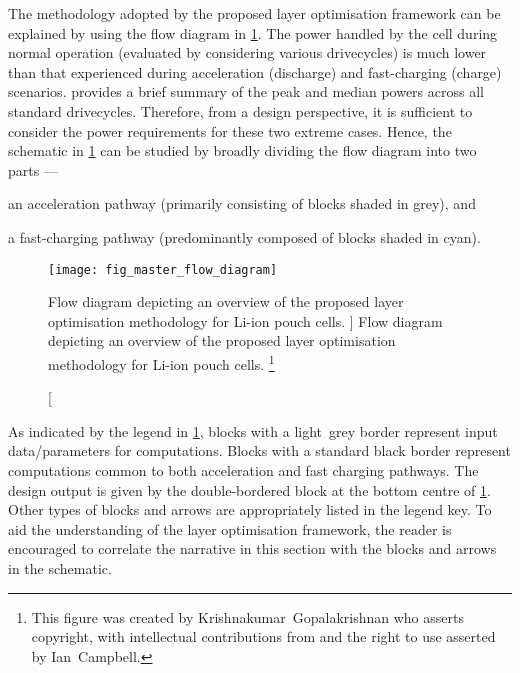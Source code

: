 

The  methodology adopted  by the  proposed layer  optimisation framework  can be
explained by  using the  flow diagram in  \cref{fig:fig_strategy_schematic}. The
power  handled by  the cell  during normal  operation (evaluated  by considering
various drivecycles)  is much  lower than  that experienced  during acceleration
(discharge)  and  fast-charging (charge)  scenarios.  
provides  a brief  summary of  the peak  and median  powers across  all standard
drivecycles. Therefore, from a design  perspective, it is sufficient to consider
the power  requirements for  these two  extreme cases.  Hence, the  schematic in
\cref{fig:fig_strategy_schematic} can  be studied  by broadly dividing  the flow
diagram into two parts ---
\begin{enumerate*}[label=\roman*)]
    \item an acceleration pathway (primarily consisting of blocks shaded in grey), and
    \item a fast-charging pathway (predominantly composed of blocks shaded in cyan).
\end{enumerate*}

\begin{figure}[p]
    \begin{minipage}[t]{\textwidth}
        \centering
        \texttt{[image: fig\_master\_flow\_diagram]}
        \captionsetup{labelsep=note}
        \caption
        [%
        Flow diagram depicting an overview of the proposed layer optimisation methodology
        for Li-ion pouch cells.
        ]%
        {%
            Flow diagram depicting an overview of the proposed layer optimisation methodology
            for Li-ion pouch cells.
        }%
        \label{fig:fig_strategy_schematic}
        \mpfootnotes[1]
        \vspace*{0.7225cm}
        \footnote{This figure was created by \mbox{Krishnakumar Gopalakrishnan} who
            asserts copyright, with intellectual contributions from and the right to
        use asserted by \mbox{Ian Campbell}.}
    \end{minipage}
\end{figure}

As indicated by  the legend in \cref{fig:fig_strategy_schematic},  blocks with a
light~grey border represent input  data/parameters for computations. Blocks with
a standard black  border represent computations common to  both acceleration and
fast charging pathways. The design output  is given by the double-bordered block
at the bottom centre of \cref{fig:fig_strategy_schematic}. Other types of blocks
and arrows are appropriately listed in  the legend key. To aid the understanding
of the layer  optimisation framework, the reader is encouraged  to correlate the
narrative in this section with the blocks and arrows in the schematic.

